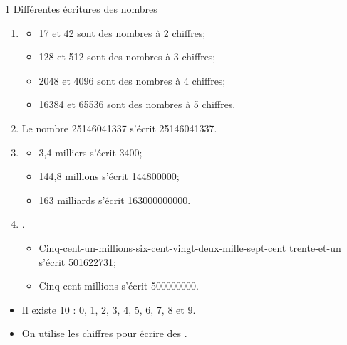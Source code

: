 \begin{myactrep}{1 Différentes écritures des nombres}
	
	\begin{enumerate}
		\item 
			\begin{itemize}
				\item 17 et 42 sont des nombres à 2 chiffres;
				\item 128 et 512 sont des nombres à 3 chiffres;
				\item \num{2048} et \num{4096} sont des nombres à 4 chiffres;
				\item \num{16384} et \num{65536} sont des nombres à 5 chiffres.
			\end{itemize}
		
		\item Le nombre 25146041337 s'écrit \num{25146041337}.
		\item 
			\begin{itemize}
				\item 3,4 milliers s'écrit \num{3400};
				\item 144,8 millions s'écrit \num{144800000};
				\item 163 milliards s'écrit \num{163000000000}.
			\end{itemize}
		
		\item .
			\begin{itemize}
				\item Cinq-cent-un-millions-six-cent-vingt-deux-mille-sept-cent trente-et-un s'écrit \num{501622731};
				\item Cinq-cent-millions s'écrit \num{500000000}.
			\end{itemize}

	\end{enumerate}
\end{myactrep}


\begin{mydef}
	\begin{itemize}
		\item Il existe 10  : 0, 1, 2, 3, 4, 5, 6, 7, 8 et 9.
		
		\item On utilise les chiffres pour écrire des .
		
		
	\end{itemize}
\end{mydef}


